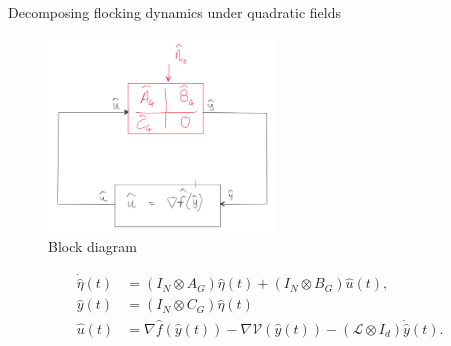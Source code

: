 \documentclass{beamer}
\begin{document}
\begin{frame}{Decomposing flocking dynamics under quadratic fields}
	\begin{figure}[t]
		\includegraphics[width=6cm]{figures/loop_multiple_agents.PNG}
		\caption{Block diagram}
		\centering
	\end{figure}
	\begin{equation} \label{eq:flocking_dynamics}
		\begin{split}
			\Dot{\hat{\eta}}(t)&=(I_N \otimes A_G)\hat{\eta}(t) + (I_N \otimes B_G)\hat{u}(t),\\
			\hat{y}(t)&=(I_N \otimes C_G)\hat{\eta}(t) \\
			\hat{u}(t)&=\nabla \hat{f}(\hat{y}(t))-\nabla \mathcal{V}(\hat{y}(t))-(\mathcal{L}\otimes I_d)\Dot{\hat{y}}(t).
		\end{split}
	\end{equation}
\end{frame}
\end{document}
